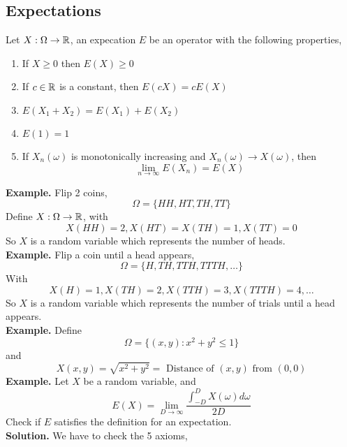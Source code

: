 \documentclass[openany]{report}
\begin{document}
\subsection{Expectations}
\begin{definition}
    
    Let $X: \Omega \to \mathbb{R}$, an expecation $E$ be an operator with the following properties, 
    \begin{enumerate}[label=(\roman*)]
        \item If $X \geq 0$ then $E(X) \geq 0$
        \item If $c \in \mathbb{R}$ is a constant, then $E(cX) = cE(X)$
        \item $E(X_1 + X_2) = E(X_1) + E(X_2)$
        \item $E(1) = 1$
        \item If $X_n(\omega)$ is monotonically increasing and $X_n(\omega) \rightarrow X(\omega)$, then 
        \[\lim_{n\rightarrow \infty} E(X_n) = E(X)\]
    \end{enumerate}
\end{definition}
\noindent
\textbf{Example.} Flip 2 coins, 
\[\Omega = \{HH, HT, TH, TT\}\]
Define $X: \Omega \rightarrow \mathbb{R}$, with 
\[X(HH) = 2, X(HT) = X(TH) = 1, X(TT) = 0\]
So $X$ is a random variable which represents the number of heads.\\[2ex]
\textbf{Example.} Flip a coin until a head appears, 
\[\Omega = \{H, TH, TTH, TTTH, \ldots\}\]
With 
\[X(H) = 1, X(TH) = 2, X(TTH) = 3, X(TTTH) = 4, \ldots\]
So $X$ is a random variable which represents the number of trials until a head appears.\\[2ex]
\textbf{Example.} Define 
\[\Omega = \{(x,y): x^2 + y^2 \leq 1\}\]
and 
\[X(x,y) = \sqrt{x^2 + y^2} = \text{ Distance of $(x,y)$ from $(0,0)$}\]
\textbf{Example.} Let $X$ be a random variable, and
\[E(X) = \lim_{D \rightarrow \infty} \frac{\int_{-D}^D X(\omega)d\omega}{2D}\]
Check if $E$ satisfies the definition for an expectation. \\[2ex]
\textbf{Solution.} We have to check the 5 axioms, 
\end{document}
